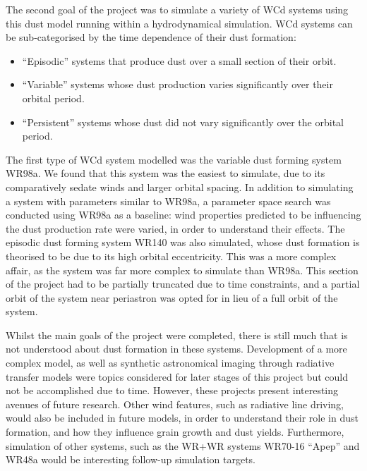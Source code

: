 The second goal of the project was to simulate a variety of WCd systems using this dust model running within a hydrodynamical simulation.
WCd systems can be sub-categorised by the time dependence of their dust formation:

\begin{itemize}
  \item ``Episodic'' systems that produce dust over a small section of their orbit. 
  \item ``Variable'' systems whose dust production varies significantly over their orbital period.
  \item ``Persistent'' systems whose dust did not vary significantly over the orbital period.
\end{itemize}

\noindent
The first type of WCd system modelled was the variable dust forming system WR98a.
We found that this system was the easiest to simulate, due to its comparatively sedate winds and larger orbital spacing. 
In addition to simulating a system with parameters similar to WR98a, a parameter space search was conducted using WR98a as a baseline: wind properties predicted to be influencing the dust production rate were varied, in order to understand their effects.
The episodic dust forming system WR140 was also simulated, whose dust formation is theorised to be due to its high orbital eccentricity.
This was a more complex affair, as the system was far more complex to simulate than WR98a.
This section of the project had to be partially truncated due to time constraints, and a partial orbit of the system near periastron was opted for in lieu of a full orbit of the system.

Whilst the main goals of the project were completed, there is still much that is not understood about dust formation in these systems.
Development of a more complex model, as well as synthetic astronomical imaging through radiative transfer models were topics considered for later stages of this project but could not be accomplished due to time.
However, these projects present interesting avenues of future research.
Other wind features, such as radiative line driving, would also be included in future models, in order to understand their role in dust formation, and how they influence grain growth and dust yields.
Furthermore, simulation of other systems, such as the WR+WR systems WR70-16 ``Apep'' and WR48a would be interesting follow-up simulation targets.

